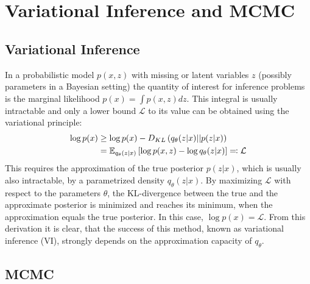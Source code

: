 \section{Variational Inference and MCMC}
\label{sec:VIandMCMC}
\subsection{Variational Inference}

In a probabilistic model $p(x, z)$ with missing or latent variables $z$ (possibly parameters in a Bayesian setting) the quantity of interest for inference problems is the marginal likelihood $p(x) = \int p(x, z) dz$. This integral is usually intractable and only a lower bound $\mathcal{L}$ to its value can be obtained using the variational principle:
\begin{equation}
\begin{split}
\log p(x) &\geq \log p(x) - D_{KL} \left( q_{\theta}(z|x) || p(z|x) \right) \\
			   &=  \mathbb{E}_{q_{\theta}(z|x)} \left[ \log p(x, z) - \log q_\theta(z|x) \right] \eqqcolon \mathcal{L}
\end{split}
\end{equation}
This requires the approximation of the true posterior $p(z|x)$, which is usually also intractable, by a parametrized density $q_{\theta}(z|x)$. By maximizing $\mathcal{L}$ with respect to the parameters $\theta$, the KL-divergence between the true and the approximate posterior is minimized and reaches its minimum, when the approximation equals the true posterior. In this case, $\log p(x) = \mathcal{L}$. From this derivation it is clear, that the success of this method, known as variational inference (VI), strongly depends on the approximation capacity of $q_\theta$.

\subsection{MCMC}
\label{sec:MCMC}


